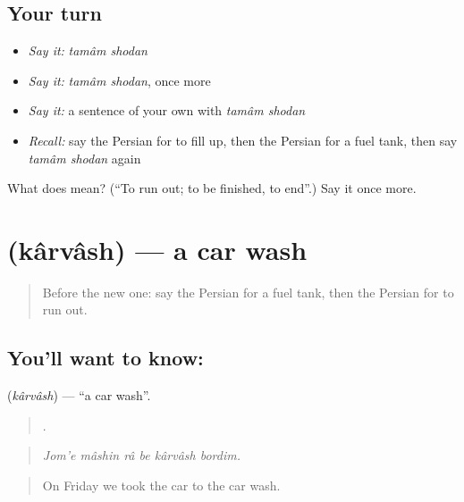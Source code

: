 \subsection*{Your turn}
\begin{itemize}
\raggedright
  \item \emph{Say it:} \emph{tamâm shodan}
  \item \emph{Say it:} \emph{tamâm shodan}, once more
  \item \emph{Say it:} a sentence of your own with \emph{tamâm shodan}
  \item \emph{Recall:} say the Persian for to fill up, then the Persian for a fuel tank, then say \emph{tamâm shodan} again
\end{itemize}

\begin{tcolorbox}[breakable,colback=teal!4,colframe=teal!35!black,title={Before you move on}]
What does   mean? (\textquotedblleft{}To run out; to be finished, to end\textquotedblright{}.) Say it once more.
\end{tcolorbox}
\section[\texorpdfstring{\fa{کارواش} (kârvâsh)}{کارواش (kârvâsh)}]{ (kârvâsh) — a car wash}

\label{lesson:FA-C423-karvash}



\begin{quote}
Before the new one: say the Persian for a fuel tank, then the Persian for to run out.
\end{quote}

\subsection*{You'll want to know: }
\textbf{} (\emph{kârvâsh}) — \textquotedblleft{}a car wash\textquotedblright{}.

\begin{quote}
     .
\end{quote}

\begin{quote}
\emph{Jom'e mâshin râ be kârvâsh bordim.}
\end{quote}

\begin{quote}
On Friday we took the car to the car wash.
\end{quote}

